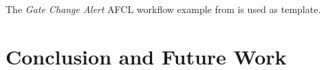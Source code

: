 \documentclass[a4paper,12pt,pdftex,halfparskip,cleardoubleempty,bibtotoc,liststotoc]{scrbook}
\begin{document}
The \textit{Gate Change Alert} AFCL workflow example from \citep{online-afcl-dps} is used as template. 




\chapter{Conclusion and Future Work}

\printbibliography
\end{document}
